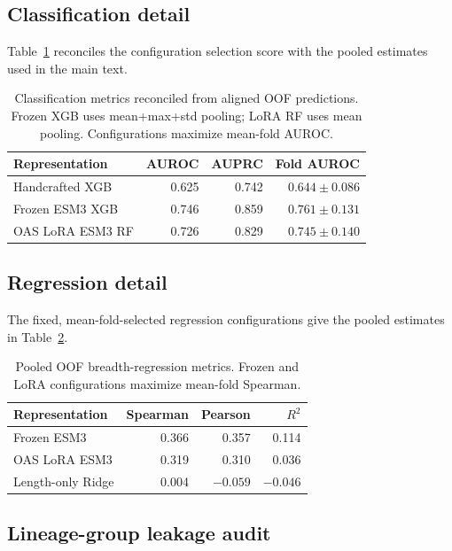 \subsection{Classification detail}

\noindent Table~\ref{tab:classification_detail} reconciles the configuration
selection score with the pooled estimates used in the main text.

\begin{table}[!htbp]
\centering
\scriptsize
\setlength{\tabcolsep}{3pt}
\begin{tabular}{lrrr}
\toprule
Representation & AUROC & AUPRC & Fold AUROC \\
\midrule
Handcrafted XGB & 0.625 & 0.742 & $0.644\pm0.086$ \\
Frozen ESM3 XGB & 0.746 & 0.859 & $0.761\pm0.131$ \\
OAS LoRA ESM3 RF & 0.726 & 0.829 & $0.745\pm0.140$ \\
\bottomrule
\end{tabular}
\caption{Classification metrics reconciled from aligned OOF predictions.
Frozen XGB uses mean+max+std pooling; LoRA RF uses mean pooling. Configurations
maximize mean-fold AUROC.}
\label{tab:classification_detail}
\end{table}

\subsection{Regression detail}

\noindent The fixed, mean-fold-selected regression configurations give the
pooled estimates in Table~\ref{tab:regression_detail}.

\begin{table}[!htbp]
\centering
\small
\begin{tabular}{lrrr}
\toprule
Representation & Spearman & Pearson & $R^2$ \\
\midrule
Frozen ESM3 & 0.366 & 0.357 & 0.114 \\
OAS LoRA ESM3 & 0.319 & 0.310 & 0.036 \\
Length-only Ridge & 0.004 & $-0.059$ & $-0.046$ \\
\bottomrule
\end{tabular}
\caption{Pooled OOF breadth-regression metrics. Frozen and LoRA configurations
maximize mean-fold Spearman.}
\label{tab:regression_detail}
\end{table}

\subsection{Lineage-group leakage audit}
\label{app:grouping_audit}

